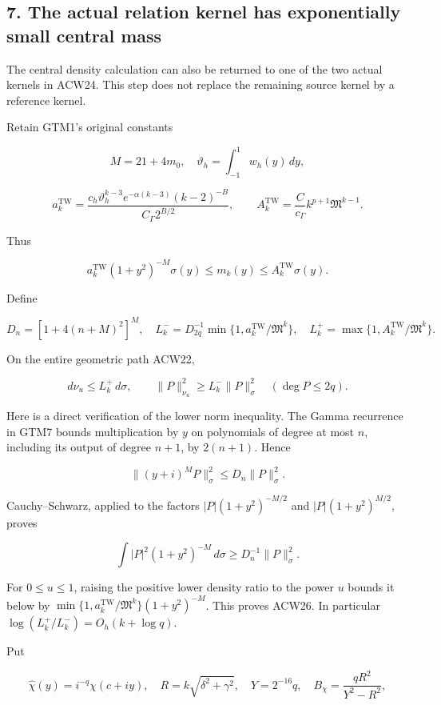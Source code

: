 \subsection{7. The actual relation kernel has exponentially small central mass}\label{the-actual-relation-kernel-has-exponentially-small-central-mass}

The central density calculation can also be returned to one of the two actual kernels in ACW24. This step does not replace the remaining source kernel by a reference kernel.

Retain GTM1's original constants

\[
M=21+4m_0,\quad
\vartheta_h=\int_{-1}^1 w_h(y)\,dy,
\]

\[
a_k^{\mathrm{TW}}=
\frac{c_h\vartheta_h^{k-3}e^{-\alpha(k-3)}(k-2)^{-B}}
 {C_\Gamma2^{B/2}},\qquad
A_k^{\mathrm{TW}}=\frac{C}{c_\Gamma}k^{p+1}\mathfrak M^{k-1}.
\]

Thus

\[
a_k^{\mathrm{TW}}(1+y^2)^{-M}\sigma(y)
\le m_k(y)\le A_k^{\mathrm{TW}}\sigma(y).
\]

Define

\[
D_n=[1+4(n+M)^2]^M,
\quad
L_k^- = D_{2q}^{-1}\min\{1,a_k^{\mathrm{TW}}/\mathfrak M^k\},
\quad
L_k^+ = \max\{1,A_k^{\mathrm{TW}}/\mathfrak M^k\}.
\tag{ACW25}
\]

On the entire geometric path ACW22,

\[
d\nu_u\le L_k^+\,d\sigma,
\qquad
\|P\|_{\nu_u}^2\ge L_k^-\|P\|_\sigma^2
\quad(\deg P\le2q).
\tag{ACW26}
\]

Here is a direct verification of the lower norm inequality. The Gamma recurrence in GTM7 bounds multiplication by \(y\) on polynomials of degree at most \(n\), including its output of degree \(n+1\), by \(2(n+1)\). Hence

\[
\|(y+i)^M P\|_\sigma^2\le D_n\|P\|_\sigma^2.
\]

Cauchy--Schwarz, applied to the factors \(|P|(1+y^2)^{-M/2}\) and \(|P|(1+y^2)^{M/2}\), proves

\[
\int|P|^2(1+y^2)^{-M}\,d\sigma\ge D_n^{-1}\|P\|_\sigma^2.
\]

For \(0\le u\le1\), raising the positive lower density ratio to the power \(u\) bounds it below by
\(\min\{1,a_k^{\mathrm{TW}}/\mathfrak M^k\}(1+y^2)^{-M}\).
This proves ACW26. In particular
\(\log(L_k^+/L_k^-)=O_h(k+\log q)\).

Put

\[
\widehat\chi(y)=i^{-q}\chi(c+iy),\quad
R=k\sqrt{\delta^2+\gamma^2},\quad
Y=2^{-16}q,\quad
B_\chi=\frac{qR^2}{Y^2-R^2},
\]

